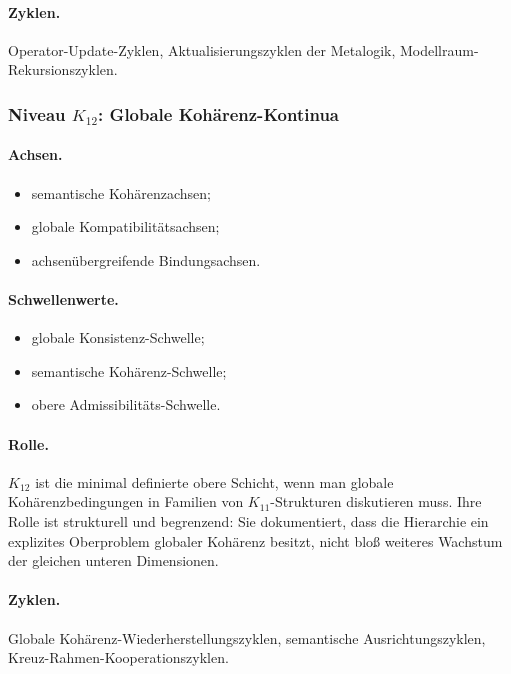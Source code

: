 \paragraph{Zyklen.}
Operator-Update-Zyklen, Aktualisierungszyklen der Metalogik,
Modellraum-Rekursionszyklen.

\subsubsection{Niveau \(K_{12}\): Globale Kohärenz-Kontinua}

\paragraph{Achsen.}
\begin{itemize}
    \item semantische Kohärenzachsen;
    \item globale Kompatibilitätsachsen;
    \item achsenübergreifende Bindungsachsen.
\end{itemize}

\paragraph{Schwellenwerte.}
\begin{itemize}
    \item globale Konsistenz-Schwelle;
    \item semantische Kohärenz-Schwelle;
    \item obere Admissibilitäts-Schwelle.
\end{itemize}

\paragraph{Rolle.}
\(K_{12}\) ist die minimal definierte obere Schicht, wenn man globale
Kohärenzbedingungen in Familien von \(K_{11}\)-Strukturen diskutieren muss.
Ihre Rolle ist strukturell und begrenzend: Sie dokumentiert, dass die Hierarchie ein
explizites Oberproblem globaler Kohärenz besitzt, nicht bloß weiteres Wachstum der
gleichen unteren Dimensionen.

\paragraph{Zyklen.}
Globale Kohärenz-Wiederherstellungszyklen, semantische Ausrichtungszyklen,
Kreuz-Rahmen-Kooperationszyklen.

